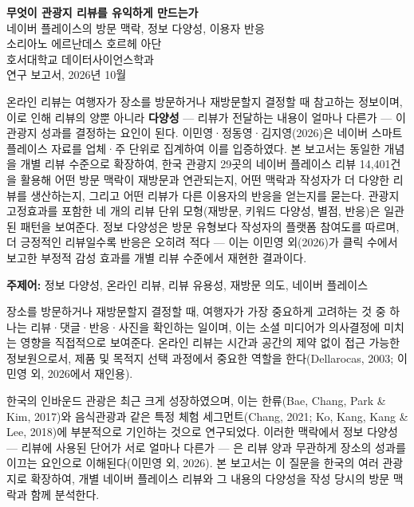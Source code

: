 \documentclass[10pt,a4paper]{article}
\newcommand{\sect}[1]{\vspace{10pt}\noindent{\Large\bfseries #1}\par\vspace{3pt}}
\newcommand{\subsect}[1]{\vspace{6pt}\noindent{\large\bfseries #1}\par\vspace{2pt}}
\begin{document}
\begin{center}
{\LARGE\bfseries 무엇이 관광지 리뷰를 유익하게 만드는가}\\[4pt]
{\Large 네이버 플레이스의 방문 맥락, 정보 다양성, 이용자 반응}\\[10pt]
{\normalsize 소리아노 에르난데스 호르헤 아단}\\
{\small 호서대학교 데이터사이언스학과}\\
{\small 연구 보고서, 2026년 10월}
\end{center}

\vspace{6pt}
\subsect{국문초록}
온라인 리뷰는 여행자가 장소를 방문하거나 재방문할지 결정할 때 참고하는 정보이며,
이로 인해 리뷰의 양뿐 아니라 \textbf{다양성} — 리뷰가 전달하는 내용이 얼마나
다른가 — 이 관광지 성과를 결정하는 요인이 된다. 이민영·정동영·김지영(2026)은
네이버 스마트 플레이스 자료를 업체·주 단위로 집계하여 이를 입증하였다. 본
보고서는 동일한 개념을 개별 리뷰 수준으로 확장하여, 한국 관광지 29곳의 네이버
플레이스 리뷰 14,401건을 활용해 어떤 방문 맥락이 재방문과 연관되는지, 어떤
맥락과 작성자가 더 다양한 리뷰를 생산하는지, 그리고 어떤 리뷰가 다른 이용자의
반응을 얻는지를 묻는다. 관광지 고정효과를 포함한 네 개의 리뷰 단위 모형(재방문,
키워드 다양성, 별점, 반응)은 일관된 패턴을 보여준다. 정보 다양성은 방문 유형보다
작성자의 플랫폼 참여도를 따르며, 더 긍정적인 리뷰일수록 반응은 오히려 적다 —
이는 이민영 외(2026)가 클릭 수에서 보고한 부정적 감성 효과를 개별 리뷰 수준에서
재현한 결과이다.

\textbf{주제어:} 정보 다양성, 온라인 리뷰, 리뷰 유용성, 재방문 의도, 네이버 플레이스

\sect{I. 서론}

\subsect{1.1 연구배경}
장소를 방문하거나 재방문할지 결정할 때, 여행자가 가장 중요하게 고려하는 것 중
하나는 리뷰·댓글·반응·사진을 확인하는 일이며, 이는 소셜 미디어가 의사결정에
미치는 영향을 직접적으로 보여준다. 온라인 리뷰는 시간과 공간의 제약 없이 접근
가능한 정보원으로서, 제품 및 목적지 선택 과정에서 중요한 역할을 한다(Dellarocas,
2003; 이민영 외, 2026에서 재인용).

한국의 인바운드 관광은 최근 크게 성장하였으며, 이는 한류(Bae, Chang, Park \&
Kim, 2017)와 음식관광과 같은 특정 체험 세그먼트(Chang, 2021; Ko, Kang, Kang \&
Lee, 2018)에 부분적으로 기인하는 것으로 연구되었다. 이러한 맥락에서 정보
다양성 — 리뷰에 사용된 단어가 서로 얼마나 다른가 — 은 리뷰 양과 무관하게
장소의 성과를 이끄는 요인으로 이해된다(이민영 외, 2026). 본 보고서는 이 질문을
한국의 여러 관광지로 확장하여, 개별 네이버 플레이스 리뷰와 그 내용의 다양성을
작성 당시의 방문 맥락과 함께 분석한다.
\end{document}
